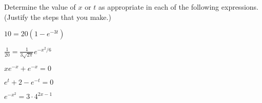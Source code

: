\begin{problem}
\item Determine the value of $x$ or $t$ as appropriate in each of the
  following expressions. (Justify the steps that you make.)
  \begin{subproblem}
  \item $10 = 20\left( 1 - e^{-3t} \right)$

    \vfill

  \item $\frac{1}{20} =  \frac{1}{3\sqrt{2\pi}} e^{-x^2/6}$
    \vfill
  \item $xe^{-x} + e^{-x} = 0$
    \vfill
    \clearpage
  \item $e^{t} + 2 - e^{-t} = 0$
    \vfill
  \item $e^{-x^2} = 3\cdot 4^{2x-1}$
    \vfill
  \end{subproblem}

  \clearpage


\end{problem}
